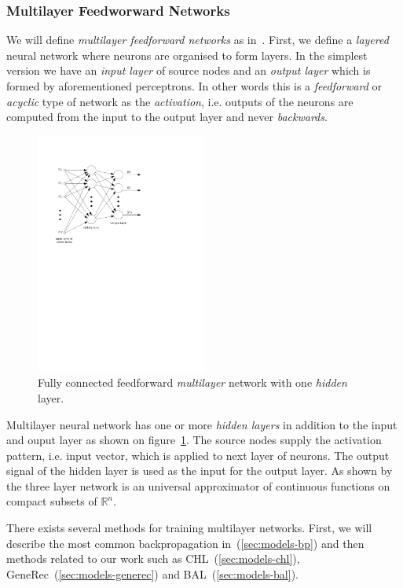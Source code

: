 \subsubsection{Multilayer Feedworward Networks} 
\label{sec:theory-multilayer} 

We will define \emph{multilayer feedforward networks} as in~\citet{haykin1994neural}. First, we define a \emph{layered} neural network where neurons are organised to form layers. In the simplest version we have an \emph{input layer} of source nodes and an \emph{output layer} which is formed by aforementioned perceptrons. In other words this is a \emph{feedforward} or \emph{acyclic} type of network as the \emph{activation}, i.e. outputs of the neurons are computed from the input to the output layer and never \emph{backwards}. 

\begin{figure}[H]
  \centering
  \includegraphics[width=0.5\textwidth]{img/multilayer.pdf}    
  \caption{Fully connected feedforward \emph{multilayer} network with one \emph{hidden} layer. } 
  \label{fig:multilayer}
\end{figure}

Multilayer neural network has one or more \emph{hidden layers} in addition to the input and ouput layer as shown on figure~\ref{fig:multilayer}. The source nodes supply the activation pattern, i.e. input vector, which is applied to next layer of neurons. The output signal of the hidden layer is used as the input for the output layer. As shown by~\citet{cybenko1989approximation} the three layer network is an universal approximator of continuous functions on compact subsets of $\mathbb{R}^n$.

There exists several methods for training multilayer networks. First, we will describe the most common backpropagation in~(\ref{sec:models-bp}) and then methods related to our work such as CHL~(\ref{sec:models-chl}), GeneRec~(\ref{sec:models-generec}) and BAL~(\ref{sec:models-bal}). 
